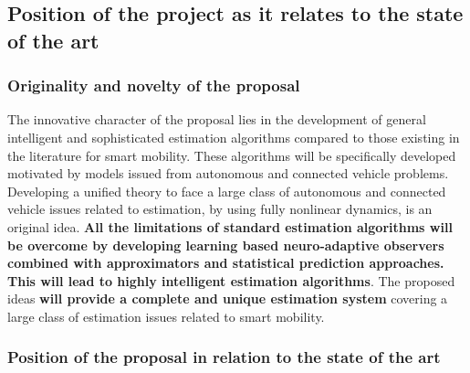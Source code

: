 \documentclass[a4paper,11pt]{article}
\begin{document}


%
\subsection[Position of the project as it relates to the state of the art]{Position of the project as it relates to the state of the art}
%
%
\subsubsection{Originality and novelty of the proposal}
%
The innovative character of the proposal lies in the development of general intelligent and sophisticated estimation algorithms compared to those existing in the literature for smart mobility. These algorithms will be specifically developed motivated by models issued from autonomous and connected vehicle problems. Developing a unified theory to face a large class of autonomous and connected vehicle issues related to estimation, by using fully nonlinear dynamics, is an original idea. 
{\bf All the limitations of standard estimation algorithms will be overcome by developing learning based neuro-adaptive observers combined with approximators and statistical prediction approaches. This will lead to highly intelligent estimation algorithms}. The proposed ideas {\bf will provide a complete and unique estimation system} covering a large class of estimation issues related to smart mobility.
%


%
\subsubsection{Position of the proposal in relation to the state of the art}
\end{document}
